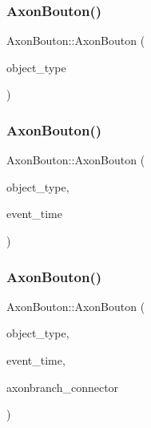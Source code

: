 \subsubsection{\texorpdfstring{Axon\+Bouton()}{AxonBouton()}\hspace{0.1cm}{\footnotesize\ttfamily [2/4]}}
{\footnotesize\ttfamily Axon\+Bouton\+::\+Axon\+Bouton (\begin{DoxyParamCaption}\item[{unsigned int}]{object\+\_\+type }\end{DoxyParamCaption})\hspace{0.3cm}{\ttfamily [inline]}}

\mbox{\label{classAxonBouton_a93e33d72d90801d29d2b16ef94b59fab}} 
\subsubsection{\texorpdfstring{Axon\+Bouton()}{AxonBouton()}\hspace{0.1cm}{\footnotesize\ttfamily [3/4]}}
{\footnotesize\ttfamily Axon\+Bouton\+::\+Axon\+Bouton (\begin{DoxyParamCaption}\item[{unsigned int}]{object\+\_\+type,  }\item[{std\+::chrono\+::time\+\_\+point$<$ \mbox{\hyperlink{universe_8h_a0ef8d951d1ca5ab3cfaf7ab4c7a6fd80}{Clock}} $>$}]{event\+\_\+time }\end{DoxyParamCaption})\hspace{0.3cm}{\ttfamily [inline]}}

\mbox{\label{classAxonBouton_a6d671fc3b6bd8e617085c1bc7212400d}} 
\subsubsection{\texorpdfstring{Axon\+Bouton()}{AxonBouton()}\hspace{0.1cm}{\footnotesize\ttfamily [4/4]}}
{\footnotesize\ttfamily Axon\+Bouton\+::\+Axon\+Bouton (\begin{DoxyParamCaption}\item[{unsigned int}]{object\+\_\+type,  }\item[{std\+::chrono\+::time\+\_\+point$<$ \mbox{\hyperlink{universe_8h_a0ef8d951d1ca5ab3cfaf7ab4c7a6fd80}{Clock}} $>$}]{event\+\_\+time,  }\item[{\mbox{\hyperlink{classAxonBranch}{Axon\+Branch}} \&}]{axonbranch\+\_\+connector }\end{DoxyParamCaption})\hspace{0.3cm}{\ttfamily [inline]}}

